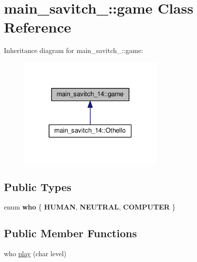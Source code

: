\hypertarget{classmain__savitch__14_1_1game}{}\section{main\+\_\+savitch\+\_\+:\+:game Class Reference}
\label{classmain__savitch__14_1_1game}


Inheritance diagram for main\+\_\+savitch\+\_\+:\+:game\+:\nopagebreak
\begin{figure}[H]
\begin{center}
\leavevmode
\includegraphics[width=207pt]{classmain__savitch__14_1_1game__inherit__graph}
\end{center}
\end{figure}
\subsection*{Public Types}
\begin{DoxyCompactItemize}
\item 
enum {\bfseries who} \{ {\bfseries H\+U\+M\+AN}, 
{\bfseries N\+E\+U\+T\+R\+AL}, 
{\bfseries C\+O\+M\+P\+U\+T\+ER}
 \}\hypertarget{classmain__savitch__14_1_1game_a4fe20fb287f809ae2b68e28e4ccba634}{}\label{classmain__savitch__14_1_1game_a4fe20fb287f809ae2b68e28e4ccba634}

\end{DoxyCompactItemize}
\subsection*{Public Member Functions}
\begin{DoxyCompactItemize}
\item 
who \hyperlink{classmain__savitch__14_1_1game_a96b7f20479c9c43bacc03b384467cba4}{play} (char level)
\end{DoxyCompactItemize}
